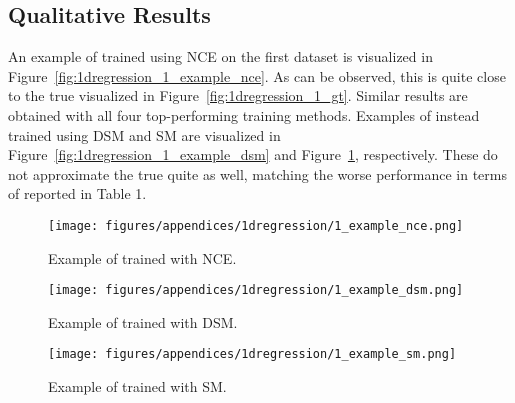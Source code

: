 \documentclass{bmvc2k}
\begin{document}
\begin{appendices}
\subsection{Qualitative Results}
An example of  trained using NCE on the first dataset is visualized in Figure~\ref{fig:1dregression_1_example_nce}. As can be observed, this is quite close to the true  visualized in Figure~\ref{fig:1dregression_1_gt}. Similar results are obtained with all four top-performing training methods. Examples of  instead trained using DSM and SM are visualized in Figure~\ref{fig:1dregression_1_example_dsm} and Figure~\ref{fig:1dregression_1_example_sm}, respectively. These do not approximate the true  quite as well, matching the worse performance in terms of  reported in Table 1.

\begin{figure}[t]\begin{minipage}{0.3125\textwidth}\centering
        \texttt{[image: figures/appendices/1dregression/1\_example\_nce.png]}\vspace{-8.0mm}
        \caption{Example of  trained with NCE.}\vspace{-0mm}
        \label{fig:1dregression_1_example_nce}\end{minipage}
    \quad
    \begin{minipage}{0.3125\textwidth}\centering
        \texttt{[image: figures/appendices/1dregression/1\_example\_dsm.png]}\vspace{-8.0mm}
        \caption{Example of  trained with DSM.}\vspace{-0mm}
        \label{fig:1dregression_1_example_dsm}\end{minipage}\quad
    \begin{minipage}{0.3125\textwidth}\centering
        \texttt{[image: figures/appendices/1dregression/1\_example\_sm.png]}\vspace{-8.0mm}
        \caption{Example of  trained with SM.}\vspace{-0mm}
        \label{fig:1dregression_1_example_sm}\end{minipage}\end{figure}











 \begin{table}[t]
\centering
{}
\end{table}
\end{appendices}
\end{document}

